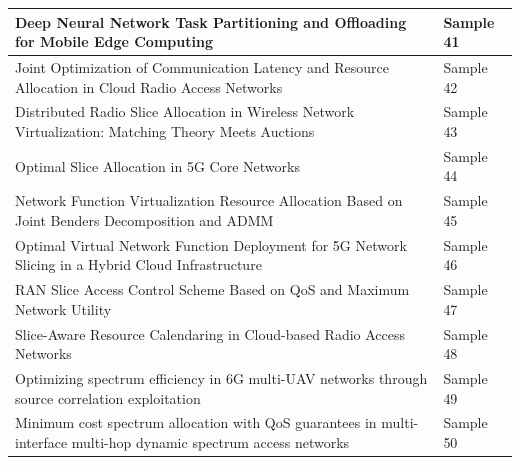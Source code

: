 \documentclass[11pt]{article}
\begin{document}
\begin{table}[htbp]
{\begin{tabular}{|>{\raggedright\arraybackslash}m{13cm}|>{\raggedright\arraybackslash}m{3.5cm}|}
\hline
Deep Neural Network Task Partitioning and
Offloading for Mobile Edge Computing  & Sample 41\\
\hline
Joint Optimization of Communication Latency and
Resource Allocation in Cloud Radio Access Networks  & Sample 42\\
\hline
Distributed Radio Slice Allocation in Wireless
Network Virtualization: Matching
Theory Meets Auctions  & Sample 43\\
\hline
Optimal Slice Allocation in 5G Core Networks  & Sample 44\\
\hline
Network Function Virtualization Resource Allocation
Based on Joint Benders Decomposition and ADMM  & Sample 45\\
\hline
Optimal Virtual Network Function Deployment
for 5G Network Slicing in a Hybrid
Cloud Infrastructure  & Sample 46\\
\hline
RAN Slice Access Control Scheme Based on
QoS and Maximum Network Utility  & Sample 47\\
\hline
Slice-Aware Resource Calendaring in Cloud-based Radio Access Networks  & Sample 48\\
\hline
Optimizing spectrum efficiency in 6G
multi-UAV networks through source correlation
exploitation  & Sample 49\\
\hline
Minimum cost spectrum allocation with QoS guarantees in multi-interface multi-hop dynamic spectrum access networks  & Sample 50\\
\hline
\end{tabular}
}
\end{table}
\end{document}
